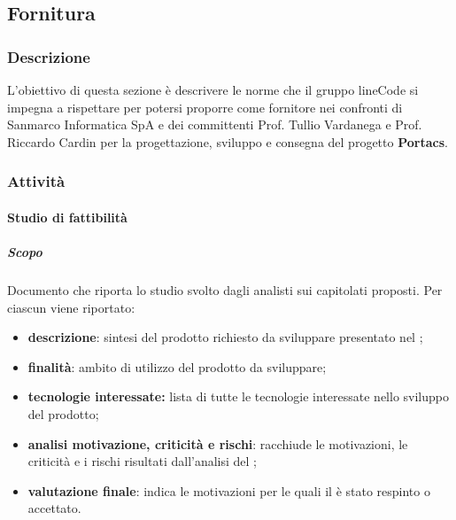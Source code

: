 \subsection{Fornitura}

	\subsubsection{Descrizione}
	L'obiettivo di questa sezione è descrivere le norme che il gruppo lineCode si impegna a rispettare per potersi proporre come fornitore nei confronti di Sanmarco Informatica SpA e dei committenti Prof. Tullio Vardanega e Prof. Riccardo Cardin per la progettazione, sviluppo e consegna del progetto \textbf{Portacs}.

	\subsubsection{Attività}
		\paragraph{Studio di fattibilità}
            \subparagraph{Scopo}
    		Documento che riporta lo studio svolto dagli analisti sui capitolati proposti. Per ciascun  viene riportato:
    		\begin{itemize}
    			\item \textbf{descrizione}: sintesi del prodotto richiesto da sviluppare presentato nel ;
    		 	\item \textbf{finalità}: ambito di utilizzo del prodotto da sviluppare;
    		 	\item \textbf{tecnologie interessate:} lista di tutte le tecnologie interessate nello sviluppo del prodotto;
    		 	\item \textbf{analisi motivazione, criticità e rischi}: racchiude le motivazioni, le criticità e i rischi risultati dall'analisi del ;
    		 	\item \textbf{valutazione finale}: indica le motivazioni per le quali il  è stato respinto o accettato.
    		\end{itemize}


